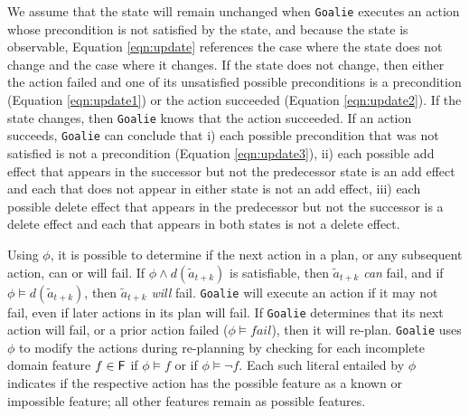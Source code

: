 \documentclass[letterpaper]{article}
\def\default{{\tt DeFault}}
\def\goalie{{\tt Goalie}}
\begin{document}
\noindent We assume that the state will remain unchanged when \goalie{} executes
an action whose precondition is not satisfied by the state, and because the
state is observable, Equation \ref{eqn:update} references the case where the
state does not change and the case where it changes.  If the state does not
change, then either the action failed and one of its unsatisfied possible
preconditions is a precondition (Equation \ref{eqn:update1}) or the action
succeeded (Equation \ref{eqn:update2}).  If the state changes, then \goalie{}
knows that the action succeeded.  If an action succeeds, \goalie{} can conclude
that i) each possible precondition that was not satisfied is not a precondition
(Equation \ref{eqn:update3}), ii) each possible add effect that appears in the
successor but not the predecessor state is an add effect and each that does not
appear in either state is not an add effect, iii) each possible delete effect
that appears in the predecessor but not the successor is a delete effect and
each that  appears in both states is not a delete effect.

Using $\phi$, it is possible to determine if the next action in a plan, or any
subsequent action, can or will fail.  If  $\phi \wedge d(\tilde{a}_{t+k})$ is
satisfiable, then $\tilde{a}_{t+k}$ {\em can} fail, and if $\phi \models
d(\tilde{a}_{t+k})$, then $\tilde{a}_{t+k}$ {\em will}  fail.  \goalie{} will
execute an action if it may not fail, even if later actions in its plan will
fail.  If \goalie{} determines that its next action will fail, or a prior action
failed ($\phi \models fail$), then it will re-plan.  \goalie{}  uses $\phi$ to
modify the actions during re-planning by checking for each incomplete domain
feature $f \in {\sf F}$ if $\phi \models f$ or if $\phi \models \neg f$.  Each
such literal entailed by $\phi$ indicates if the respective action has the
possible feature as a known or impossible feature; all other features remain as
possible features.


\end{document}
